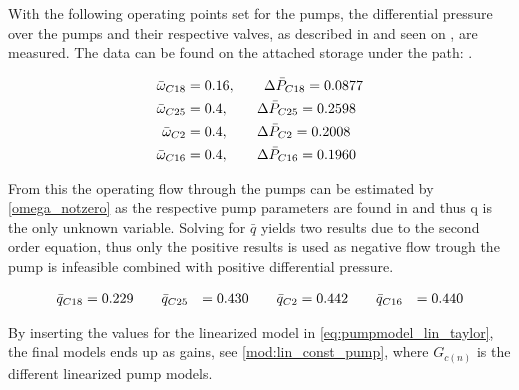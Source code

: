 
With the following operating points set for the pumps, the differential pressure over the pumps and their respective valves, as described in  and seen on , are measured. 
The data can be found on the attached storage under the path: .

\begin{equation}
\centering
	\begin{split}
	\bar{\omega}_{C18} &= 0.16,\hspace{20pt} \Delta \bar{P}_{C18} = 0.0877 \\
	\bar{\omega}_{C25} &= 0.4,\hspace{20pt} \Delta \bar{P}_{C25} = 0.2598  \\
	\bar{\omega}_{C2}  &= 0.4,\hspace{20pt} \Delta \bar{P}_{C2} = 0.2008 \\
	\bar{\omega}_{C16} &= 0.4,\hspace{20pt} \Delta \bar{P}_{C16} =0.1960 
	\end{split}
\end{equation}


From this the operating flow through the pumps can be estimated by \eqref{omega_notzero} as the respective pump parameters are found in  and thus q is the only unknown variable.
Solving for $\bar{q}$ yields two results due to the second order equation, thus only the positive results is used as negative flow trough the pump is infeasible combined with positive differential pressure.

\begin{equation}
\centering
\begin{split}
\bar{q}_{C18} &= 0.229 \hspace{20pt} \bar{q}_{C25} &= 0.430 \hspace{20pt} \bar{q}_{C2} &= 0.442 \hspace{20pt} \bar{q}_{C16} &= 0.440
\end{split}
\end{equation}

By inserting the values for the linearized model in \eqref{eq:pumpmodel_lin_taylor}, the final models ends up as gains, see \ref{mod:lin_const_pump}, where $G_{c(n)}$ is the different linearized pump models. 

